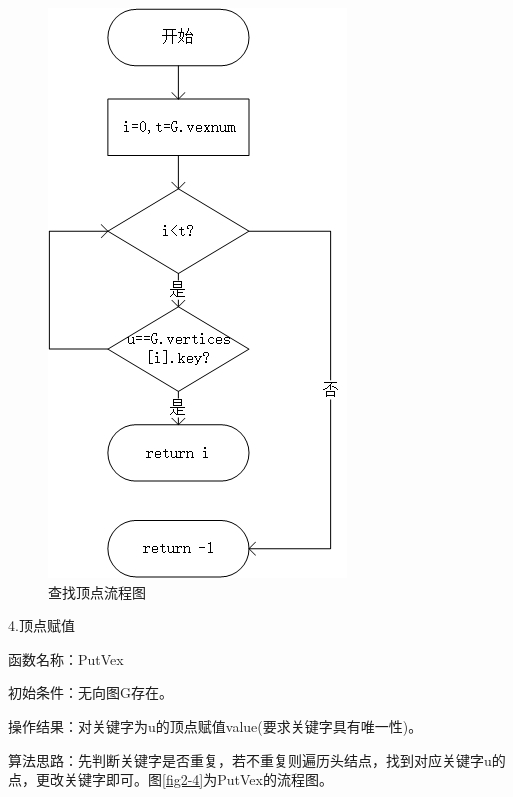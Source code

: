 \documentclass[supercite]{Experimental_Report}
\theoremstyle{definition}
\begin{document}
\begin{figure}[htb] %
	\begin{center}
		\includegraphics[scale=0.9]{./images/图/Locatevex.jpg}
		\caption{查找顶点流程图}
		\label{fig2-3}
	\end{center}
\end{figure}

\newpage

4.顶点赋值

函数名称：PutVex

初始条件：无向图G存在。

操作结果：对关键字为u的顶点赋值value(要求关键字具有唯一性)。

算法思路：先判断关键字是否重复，若不重复则遍历头结点，找到对应关键字u的点，更改关键字即可。图\ref{fig2-4}为PutVex的流程图。
\end{document}
